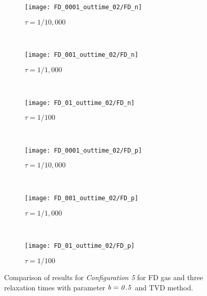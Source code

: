 \documentclass[twocolumn,prX]{revtex4} %
\begin{document}
\begin{figure}
        \centering
        \begin{subfigure}[b]{0.32\textwidth}
                \centering
                \texttt{[image: FD\_0001\_outtime\_02/FD\_n]}
                \caption{$\tau = 1/10,000$}
                \label{fig:5ESBGK_FD_n_tau0001}
        \end{subfigure}%
        ~ %
        \begin{subfigure}[b]{0.32\textwidth}
                \centering
                \texttt{[image: FD\_001\_outtime\_02/FD\_n]}
                \caption{$\tau = 1/1,000$}
                \label{fig:5ESBGK_FD_n_tau001}
        \end{subfigure}
        ~ %
        \begin{subfigure}[b]{0.32\textwidth}
                \centering
                \texttt{[image: FD\_01\_outtime\_02/FD\_n]}
                \caption{$\tau = 1/100$}
                \label{fig:5ESBGK_FD_n_tau01}
        \end{subfigure}
				~ %
        \begin{subfigure}[b]{0.32\textwidth}
                \centering
                \texttt{[image: FD\_0001\_outtime\_02/FD\_p]}
                \caption{$\tau = 1/10,000$}
                \label{fig:5ESBGK_FD_p_tau0001}
        \end{subfigure}
        ~ %
        \begin{subfigure}[b]{0.32\textwidth}
                \centering
                \texttt{[image: FD\_001\_outtime\_02/FD\_p]}
                \caption{$\tau = 1/1,000$}
                \label{fig:5ESBGK_FD_p_tau001}
        \end{subfigure}
				~ %
        \begin{subfigure}[b]{0.32\textwidth}
                \centering
                \texttt{[image: FD\_01\_outtime\_02/FD\_p]}
                \caption{$\tau = 1/100$}
                \label{fig:5ESBGK_FD_p_tau01}
        \end{subfigure}
        \caption{Comparison of results for \emph{Configuration 5} for FD gas and three relaxation times with parameter $\it{b=0.5}$ and TVD method.}
				\label{fig:FD_config5_tau_comparison}
\end{figure}
\end{document}
